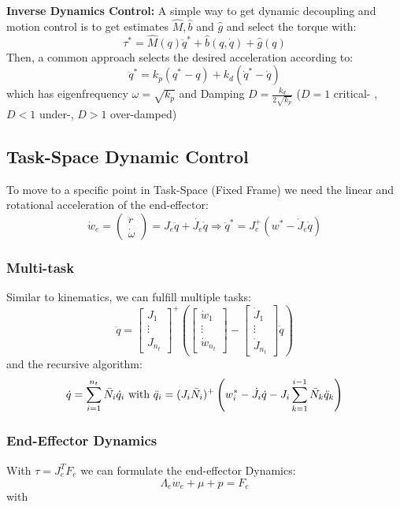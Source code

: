 \documentclass[fontsize=6pt,DIV=calc,a4paper,ngerman]{scrartcl}
\begin{document}
\begin{multicols*}{4}
	\textbf{Inverse Dynamics Control:}
	A simple way to get dynamic decoupling and motion control is to get estimates $\hat{M}, \hat{b}$ and $\hat{g}$ and select the torque with:
	$$\tau^* = \hat{M}(q)\ddot{q}^*+\hat{b}(q,\dot{q})+\hat{g}(q)$$
	Then, a common approach selects the desired acceleration according to:
	$$\ddot{q}^* = k_p(q^*-q)+k_d(\dot{q}^*-\dot{q})$$
	which has eigenfrequency $\omega = \sqrt{k_p}$ and Damping
	$D= \frac{k_d}{2\sqrt{k_p}}$ ($D=1$ critical- , $D<1$ under-, $D>1$ over-damped)

	\subsection{Task-Space Dynamic Control}
	To move to a specific point in Task-Space (Fixed Frame) we need the linear and rotational acceleration of the end-effector:
	$$\dot{w}_e= \begin{pmatrix}\ddot{r}  \\\dot{\omega}\end{pmatrix} = J_e\ddot{q} +\dot{J_e}\dot{q} \Rightarrow \ddot{q}^* = J_e^+\left(w^* - \dot{J}_e \dot{q}\right)$$

	\subsubsection{Multi-task}
	Similar to kinematics, we can fulfill multiple tasks:
	$$\ddot{q}=\begin{bmatrix}J_1 \\ \vdots \\ J_{n_t}\end{bmatrix}^+ \left( \begin{bmatrix}\dot{w}_1 \\ \vdots\\ \dot{w}_{n_t}\end{bmatrix}-\begin{bmatrix}\dot{J}_1 \\ \vdots \\ \dot{J}_{n_t}\end{bmatrix}\dot{q}\right)$$
	and the recursive algorithm:
	$$\dot{q}= \sum_{i=1}^{n_t}\Bar{N}_i\dot{q}_i \text{ with } \ddot{q}_i = (J_i\Bar{N}_i)^+\left( w_i^* -\dot{J_i}\dot{q}- J_i \sum_{k=1}^{i-1}\Bar{N}_k\ddot{q}_k\right)$$

	\subsubsection{End-Effector Dynamics}
	With $\tau = J_e^TF_e$ we can formulate the end-effector Dynamics:
	$$\Lambda_e \dot{w}_e+\mu +p = F_e$$
	with 


\end{multicols*}
\end{document}
